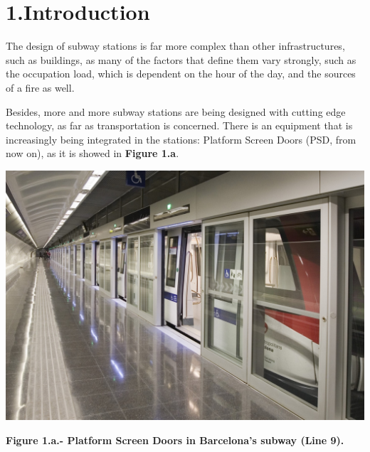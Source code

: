 \documentclass{article}
\begin{document}
\section{1.\hspace*{0.5em}Introduction}\label{sec-intro}%

\noindent{}The design of subway stations is far more complex than other infrastructures, such as buildings, as many of the factors 
that define them vary strongly, such as the occupation load, which is dependent on the hour of the day, and the sources 
of a fire as well.%

Besides, more and more subway stations are being designed with cutting edge technology, as far as transportation is 
concerned. There is an equipment that is increasingly being integrated in the stations: Platform Screen 
Doors (PSD, from now on), as it is showed in \textbf{Figure 1.a}.%

\begin{mdcenter}%

\noindent{}\includegraphics[keepaspectratio=true,width=\dimmin{}{\dimwidth{0.55}}]{images/Fig-1.a}{}%
\end{mdcenter}%

\begin{mdcenter}%

\noindent{}\textbf{Figure 1.a.- Platform Screen Doors in Barcelona's subway (Line 9).}%
\end{mdcenter}%
\end{document}
